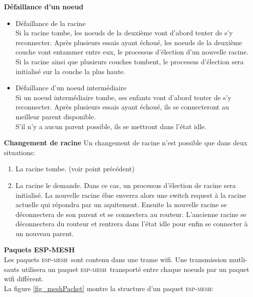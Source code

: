 \documentclass[a4paper, 12pt]{report}
\newcommand{\espmesh}{\textsc{esp-mesh}}
\begin{document}
        \vspace{0.5cm}
        \textbf{Défaillance d'un noeud}\newline
            \begin{itemize}
                \item Défaillance de la racine\\
                    Si la racine tombe, les noeuds de la deuxième vont d'abord tenter de s'y reconnecter.
                    Après plusieurs essais ayant échoué, les noeuds de la deuxième couche vont entammer entre eux, le processus d'élection d'un nouvelle racine.\\
                    Si la racine ainsi que plusieurs couches tombent, le processus d'élection sera initialisé sur la couche la plus haute.


                \item Défaillance d'un noeud intermédiaire\\
                    Si un noeud intermédiaire tombe, ses enfants vont d'abord tenter de s'y reconnecter.
                    Après plusieurs essais ayant échoué, ils se connecteront au meilleur parent disponible.\\
                    S'il n'y a aucun parent possible, ils se mettront dans l'état idle.
            \end{itemize}
            \vspace{0.5cm}
            \textbf{Changement de racine}\newline
                Un changement de racine n'est possible que dans deux situations:
                \begin{enumerate}
                    \item La racine tombe. (voir point précédent)
                    \item La racine le demande.
                        Dans ce cas, un processus d'élection de racine sera initialisé. La nouvelle racine élue
                        enverra alors une switch request à la racine actuelle qui répondra par un aquitement.
                        Ensuite la nouvelle racine se déconnectera de son parent et se connectera au routeur.
                        L'ancienne racine se déconnectera du routeur et rentrera dans l'état idle pour enfin se connecter à un nouveau parent.
                \end{enumerate}
        \textbf{Paquets ESP-MESH}\\
            Les paquets \espmesh\ sont contenu dans une trame wifi. Une transmission mutli-sauts utilisera un paquet \espmesh\ transporté entre chaque noeuds par un paquet wifi différent.\\
            La figure \ref{fig_meshPacket} montre la structure d'un paquet \espmesh:\\
\end{document}
